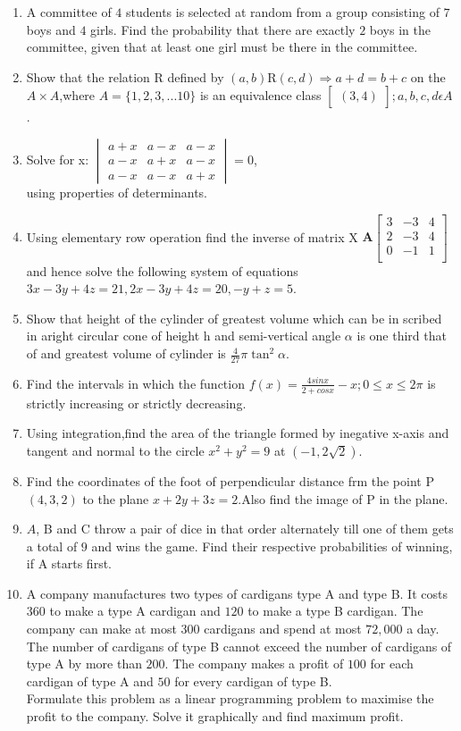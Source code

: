 \documentclass[12pt,-letter paper]{article}
\let\vec\mathbf{}
\let\vec\mathbf{}
\let\vec\mathbf{}
\providecommand{\mydet}[1]{\ensuremath{\begin{vmatrix}#1\end{vmatrix}}}
\providecommand{\myvec}[1]{\ensuremath{\begin{bmatrix}#1\end{bmatrix}}}
\providecommand{\brak}[1]{\ensuremath{\left(#1\right)}}
\begin{document}
\begin{enumerate}
	\item A committee of $4$ students is selected at random from a group consisting of $7$ boys and $4$ girls. Find the probability that there are exactly $2$ boys in the committee, given that at least one girl must be there in the committee.
	\item Show that the relation R defined by \brak{a,b}R\brak{c,d}$\Rightarrow a+d=b+c$ on the $A\times A$,where $A=\{1,2,3,...10\}$ is an equivalence class $\myvec{\brak{3,4}};a,b,c,d \epsilon A$.
		\item Solve for x: $\mydet{a+x&a-x&a-x\\a-x&a+x&a-x\\a-x&a-x&a+x}=0$,\\
		 using properties of determinants.
	 \item Using elementary row operation find the inverse of matrix X $\vec{A}\myvec{3&-3&4\\
			 2&-3&4\\
			 0&-1&1\\}$ and hence solve the following system of equations $3x-3y+4z=21,2x-3y+4z=20,-y+z=5$.
	 \item Show that height of the cylinder of greatest volume which can be in scribed in aright circular cone of height h and semi-vertical angle $\alpha$ is one third that of and greatest volume of cylinder is $\frac{4}{27}\pi \tan^2 \alpha$.
		 \item Find the intervals in which the function $f(x)=\frac{4sinx}{2+cosx}-x;0\leq x \leq 2\pi$ is strictly increasing or strictly decreasing.
		 \item Using integration,find the area of the triangle formed by inegative x-axis and tangent and normal to the circle $x^2+y^2=9$ at $\brak{-1,2\sqrt{2}}$.
	 \item Find the coordinates of the foot of perpendicular distance frm the point P $\brak{4,3,2}$ to the plane $x+2y+3z=2$.Also find the image of P in the plane.
	 \item $A$, B and C throw a pair of dice in that order alternately till one of them gets a total of $9$ and wins the game. Find their respective probabilities of winning, if A starts first.
	 \item A company manufactures two types of cardigans type A and type B. It costs \rupee $360$ to make a type A cardigan and \rupee $120$ to make a type B cardigan. The company can make at most $300$ cardigans and spend at most \rupee $72,000$ a day. The number of cardigans of type B cannot exceed the number of cardigans of type A by more than \rupee $200$. The company makes a profit of \rupee $100$ for each cardigan of type A and \rupee $50$ for every cardigan of type B.\\

Formulate this problem as a linear programming problem to maximise the profit to the company. Solve it graphically and find maximum profit.
\end{enumerate}
\end{document}
